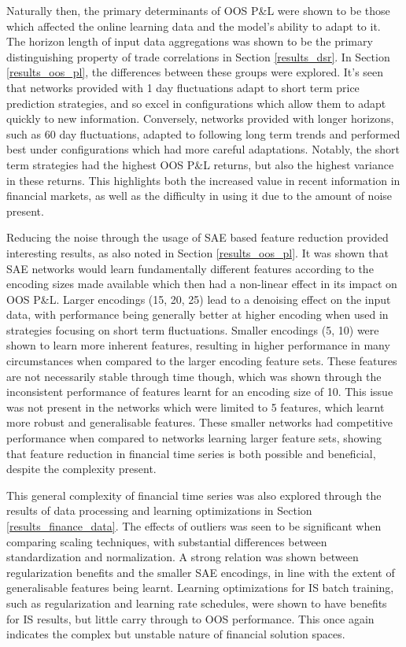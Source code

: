 \documentclass[a4paper,11pt,oneside]{article}
\theoremstyle{plain}
\theoremstyle{definition}
\begin{document}
	Naturally then, the primary determinants of OOS P\&L were shown to be those which affected the online learning data and the model's ability to adapt to it. The horizon length of input data aggregations was shown to be the primary distinguishing property of trade correlations in Section \ref{results_dsr}. In Section \ref{results_oos_pl}, the differences between these groups were explored. It's seen that networks provided with 1 day fluctuations adapt to short term price prediction strategies, and so excel in configurations which allow them to adapt quickly to new information. Conversely, networks provided with longer horizons, such as 60 day fluctuations, adapted to following long term trends and performed best under configurations which had more careful adaptations. Notably, the short term strategies had the highest OOS P\&L returns, but also the highest variance in these returns. This highlights both the increased value in recent information in financial markets, as well as the difficulty in using it due to the amount of noise present.\newline 
	
	Reducing the noise through the usage of SAE based feature reduction provided interesting results, as also noted in Section \ref{results_oos_pl}. It was shown that SAE networks would learn fundamentally different features according to the encoding sizes made available which then had a non-linear effect in its impact on OOS P\&L. Larger encodings (15, 20, 25) lead to a denoising effect on the input data, with performance being generally better at higher encoding when used in strategies focusing on short term fluctuations. Smaller encodings (5, 10) were shown to learn more inherent features, resulting in higher performance in many circumstances when compared to the larger encoding feature sets. These features are not necessarily stable through time though, which was shown through the inconsistent performance of features learnt for an encoding size of 10. This issue was not present in the networks which were limited to 5 features, which learnt more robust and generalisable features. These smaller networks had competitive performance when compared to networks learning larger feature sets, showing that feature reduction in financial time series is both possible and beneficial, despite the complexity present. \newline	
	
	This general complexity of financial time series was also explored through the results of data processing and learning optimizations in Section \ref{results_finance_data}. The effects of outliers was seen to be significant when comparing scaling techniques, with substantial differences between standardization and normalization. A strong relation was shown between regularization benefits and the smaller SAE encodings, in line with the extent of generalisable features being learnt. Learning optimizations for IS batch training, such as regularization and learning rate schedules, were shown to have benefits for IS results, but little carry through to OOS performance. This once again indicates the complex but unstable nature of financial solution spaces.\newline	
	
\end{document}
